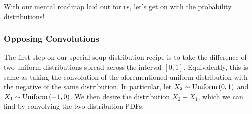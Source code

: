 With our mental roadmap laid out for us, let's get on with the probability
distributions!

\subsubsection{Opposing Convolutions}

The first step on our special soup distribution  recipe is to take the difference of
two uniform distributions spread across the interval \( \left[ 0, 1 \right] \).
Equivalently, this is same as taking the convolution of the aforementioned
uniform distribution with the negative of the same distribution.
 In
particular, let \( X_2 \sim \operatorname{Uniform} \left( 0, 1 \right) \) and \( X_1 \sim
\operatorname{Uniform} \left( -1, 0 \right) \). We then desire the distribution \( X_2 + X_1 \), which we
can find by convolving the two distribution PDFs.

